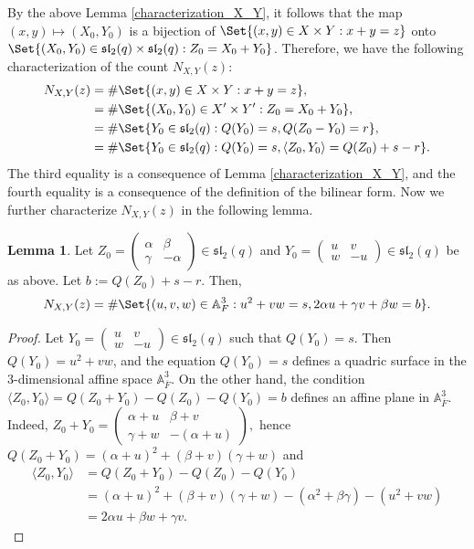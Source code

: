 \documentclass[preprint,11pt]{amsart}
\def\A{\mathbb{A}}
\theoremstyle{definition}
\numberwithin{thm}{section}
\newtheorem{lem}[thm]{Lemma}
\newcommand{\gam}{\gamma}
\def\sl{\mathfrak{sl}}
\newcommand{\ip}[1]{\langle #1 \rangle}
\newcommand{\al}{\alpha}
\newcommand{\ol}[1]{\overline{#1}}
\begin{document}
By the above Lemma \ref{characterization_X_Y}, it follows that the  map $(x,y) \mapsto (X_0, Y_0)$ is a bijection of  $\Set{(x,y) \in X \times Y : x + y = z}$ onto $\Set{(X_0, Y_0) \in \sl_2(q) \times \sl_2(q): Z_0 = X_0 + Y_0}$.  Therefore, we have the following characterization of the count $N_{X, Y}(z)$:
\begin{align*}
N_{X, Y}(z) &= \#\Set{ (x,y) \in X \times Y : x + y = z}, \\
&= \#\Set{(X_0, Y_0) \in X' \times Y' : Z_0 = X_0 + Y_0}, \\
&= \# \Set{Y_0 \in \sl_2(q) : Q(Y_0) = s, Q(Z_0 - Y_0) = r}, \\
&= \# \Set{Y_0 \in \sl_2(q): Q(Y_0) = s, \ip{Z_0,Y_0} = Q(Z_0) + s - r }.
\end{align*}
The third equality is a consequence of Lemma \ref{characterization_X_Y}, and the fourth equality is a consequence of the definition of the bilinear form. Now we further characterize $N_{X, Y}(z)$ in the following lemma. 


\begin{lem}\label{further_char}
Let $Z_0 = \begin{pmatrix} \al & \beta  \\ \gamma  & - \alpha \end{pmatrix} \in \sl_2(q)$ and $Y_0 =  \begin{pmatrix} u & v \\ w & - u \end{pmatrix} \in \sl_2(q)$ be as above. Let $b := Q(Z_0) + s - r$. Then, 
$$
N_{X, Y}(z) = \# \Set{ (u,v,w) \in \A_{F}^3 :  u^2 + v w = s , 
2 \al u + \gam v + \beta w = b }.
$$
\end{lem}

\begin{proof}
Let $Y_0 = \begin{pmatrix} u & v \\ w & - u \end{pmatrix} \in \sl_2(q)$ such that $Q(Y_0) = s$. Then $Q(Y_0) = u^2 + v w$, and the equation $Q(Y_0) = s$ defines a quadric surface in the $3$-dimensional affine space $\A_{\overline{F}}^3$. 
On the other hand, the condition $\ip{Z_0, Y_0} = Q(Z_0 + Y_0) - Q(Z_0) - Q(Y_0) = b$ defines an affine plane in $\A_{\ol{F}}^3$. Indeed,
$
Z_0 + Y_0 = \begin{pmatrix} \al + u & \beta + v \\ \gam + w & - (\al + u) \end{pmatrix},
$
hence $Q(Z_0 + Y_0) = (\al+u)^2 + (\beta + v) (\gam + w)$ and 
\begin{align*}
\ip{Z_0, Y_0} &= Q(Z_0 + Y_0) - Q(Z_0) - Q(Y_0) \\
&= (\al + u)^2 + (\beta + v) (\gam + w) - (\al^2 + \beta \gam) - (u^2 + vw) \\
&= 2 \al u + \beta w + \gam v.
\end{align*}
\end{proof}
\end{document}
